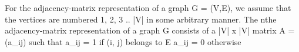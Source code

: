 \documentclass[preview]{standalone}
\begin{document}
\begin{center}
For the adjacency-matrix representation of a graph G = (V,E), we assume
that the vertices are numbered 1, 2, 3 .. |V| in some arbitrary manner. The nthe adjacency-matrix representation of a graph G consists of a |V| x |V| matrix
A = (a_ij) such that
a_ij = 1 if (i, j) belongs to E
a_ij = 0 otherwise
\end{center}
\end{document}
